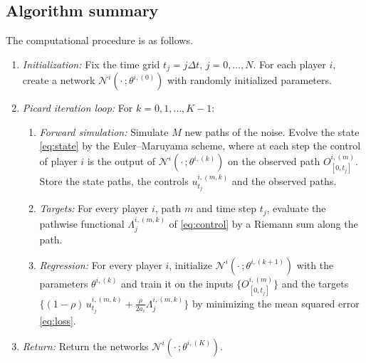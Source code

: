\documentclass[11pt]{article}
\begin{document}
\subsection{Algorithm summary}
\label{sec:algorithm}

The computational procedure is as follows.
\begin{enumerate}[itemsep=4pt]
    \item \textit{Initialization:} Fix the time grid $t_j = j \Delta t$, $j = 0, \dots, N$. For each player $i$, create a network $\mathcal{N}^i(\cdot\,; \theta^{i,(0)})$ with randomly initialized parameters.

    \item \textit{Picard iteration loop:} For $k = 0, 1, \dots, K - 1$:
        \begin{enumerate}[label=(\alph*), itemsep=4pt]
            \item \textit{Forward simulation:} Simulate $M$ new paths of the noise. Evolve the state \eqref{eq:state} by the Euler--Maruyama scheme, where at each step the control of player $i$ is the output of $\mathcal{N}^i(\cdot\,; \theta^{i,(k)})$ on the observed path $O^{i,(m)}_{[0, t_j]}$. Store the state paths, the controls $u^{i,(m,k)}_{t_j}$ and the observed paths.

            \item \textit{Targets:} For every player $i$, path $m$ and time step $t_j$, evaluate the pathwise functional $\Lambda^{i,(m,k)}_j$ of \eqref{eq:control} by a Riemann sum along the path.

            \item \textit{Regression:} For every player $i$, initialize $\mathcal{N}^i(\cdot\,; \theta^{i,(k+1)})$ with the parameters $\theta^{i,(k)}$ and train it on the inputs $\{O^{i,(m)}_{[0, t_j]}\}$ and the targets $\{(1 - \rho)\, u^{i,(m,k)}_{t_j} + \tfrac{\rho}{2 a_i} \Lambda^{i,(m,k)}_j\}$ by minimizing the mean squared error \eqref{eq:loss}.
        \end{enumerate}

    \item \textit{Return:} Return the networks $\mathcal{N}^i(\cdot\,; \theta^{i,(K)})$.
\end{enumerate}
\end{document}
